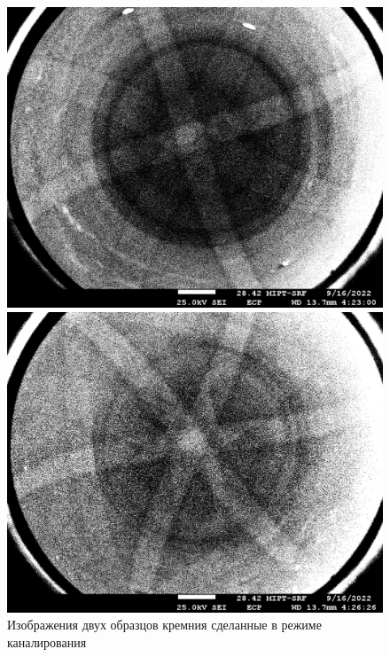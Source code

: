 \documentclass[a4paper,12pt]{article} %
\begin{document}
\begin{figure}[h]
\centering
\begin{minipage}{0.49\textwidth}
\includegraphics[width=\textwidth]{Si005.jpg}
\vspace{-2em}
\end{minipage}
\begin{minipage}{0.49\textwidth}
\includegraphics[width=\textwidth]{Si006.jpg}
\vspace{-2em}
\end{minipage}

\caption{Изображения двух образцов кремния сделанные в режиме каналирования}
\label{fig:si}
\end{figure}
\end{document}

